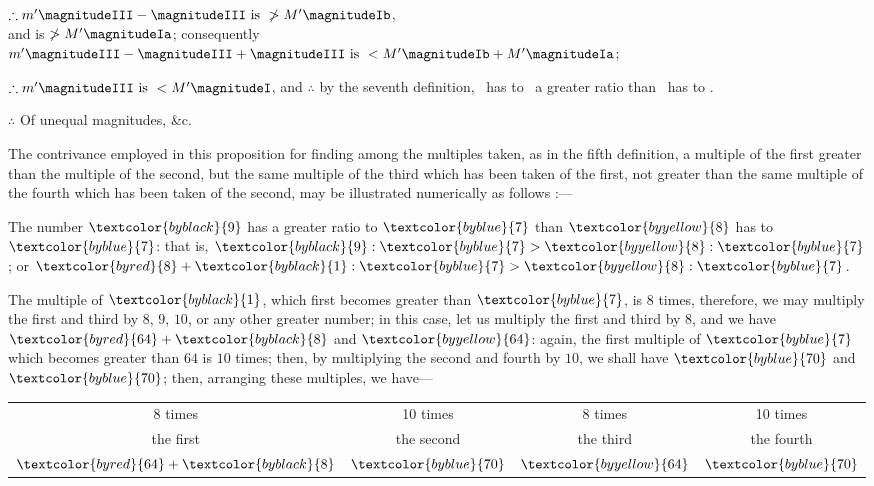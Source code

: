 \documentclass[booklanguage=english]{byrnebook}
\begin{document}
\begin{center}
$\therefore m' \magnitudeIII - \magnitudeIII \mbox{ is } \ngtr M' \magnitudeIb$,\\ %
and \magnitudeIII is $\ngtr M' \magnitudeIa$; consequently\\ %
$m' \magnitudeIII - \magnitudeIII + \magnitudeIII \mbox{ is } < M' \magnitudeIb + M' \magnitudeIa$; %

$\therefore m' \magnitudeIII \mbox{ is } < M' \magnitudeI$, and $\therefore$ by the seventh definition, \magnitudeIII\ has to \magnitudeII\ a greater ratio than \magnitudeIII\ has to \magnitudeI.

$\therefore$ Of unequal magnitudes, \&c.
\end{center}

The contrivance employed in this proposition for finding among the multiples taken, as in the fifth definition, a multiple of the first greater than the multiple of the second, but the same multiple of the third which has been taken of the first, not greater than the same multiple of the fourth which has been taken of the second, may be illustrated numerically as follows :—

The number $\textcolor{byblack}{9}$ has a greater ratio to $\textcolor{byblue}{7}$ than $\textcolor{byyellow}{8}$ has to $\textcolor{byblue}{7}$: that is, $\textcolor{byblack}{9} : \textcolor{byblue}{7} > \textcolor{byyellow}{8} : \textcolor{byblue}{7}$; or $\textcolor{byred}{8} + \textcolor{byblack}{1} : \textcolor{byblue}{7} > \textcolor{byyellow}{8} : \textcolor{byblue}{7}$.

The multiple of $\textcolor{byblack}{1}$, which first becomes greater than $\textcolor{byblue}{7}$, is $8$ times, therefore, we may multiply the first and third by $8$, $9$, $10$, or any other greater number; in this case, let us multiply the first and third by $8$, and we have $\textcolor{byred}{64} + \textcolor{byblack}{8}$ and $\textcolor{byyellow}{64}$: again, the first multiple of $\textcolor{byblue}{7}$ which becomes greater than $64$ is $10$ times; then, by multiplying the second and fourth by $10$, we shall have $\textcolor{byblue}{70}$ and $\textcolor{byblue}{70}$; then, arranging these multiples, we have—

\begin{center}
{\renewcommand{\arraystretch}{0.75}
\begin{tabular}{c c c c}
{\footnotesize 8 times} & {\footnotesize 10 times} & {\footnotesize 8 times} & {\footnotesize 10 times} \\
{\footnotesize the first} & {\footnotesize the second} & {\footnotesize the third} & {\footnotesize the fourth} \\
$\textcolor{byred}{64} + \textcolor{byblack}{8}$ & $\textcolor{byblue}{70}$ & $\textcolor{byyellow}{64}$ & $\textcolor{byblue}{70}$ \\
\end{tabular}
}
\end{center}
\end{document}
